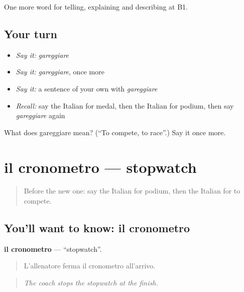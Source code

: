 \begin{grammarlens}[title={What you've built}]
One more word for telling, explaining and describing at B1.
\end{grammarlens}

\subsection*{Your turn}
\begin{itemize}
\raggedright
  \item \emph{Say it:} \emph{gareggiare}
  \item \emph{Say it:} \emph{gareggiare}, once more
  \item \emph{Say it:} a sentence of your own with \emph{gareggiare}
  \item \emph{Recall:} say the Italian for medal, then the Italian for podium, then say \emph{gareggiare} again
\end{itemize}

\begin{tcolorbox}[breakable,colback=teal!4,colframe=teal!35!black,title={Before you move on}]
What does gareggiare mean? (\textquotedblleft{}To compete, to race\textquotedblright{}.) Say it once more.
\end{tcolorbox}
\section[il cronometro]{il cronometro — stopwatch}

\label{lesson:IT-C513-cronometro}



\begin{quote}
Before the new one: say the Italian for podium, then the Italian for to compete.
\end{quote}

\subsection*{You'll want to know: il cronometro}
\textbf{il cronometro} — \textquotedblleft{}stopwatch\textquotedblright{}.

\begin{quote}
L'allenatore ferma il cronometro all'arrivo.
\end{quote}

\begin{quote}
\emph{The coach stops the stopwatch at the finish.}
\end{quote}

